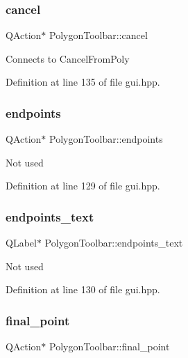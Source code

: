 \subsubsection{\texorpdfstring{cancel}{cancel}}
{\footnotesize\ttfamily Q\+Action$\ast$ Polygon\+Toolbar\+::cancel}

Connects to Cancel\+From\+Poly 

Definition at line 135 of file gui.\+hpp.

\mbox{\label{structPolygonToolbar_a78a569efc30754e02b7d8f5d74ede0ec}} 
\subsubsection{\texorpdfstring{endpoints}{endpoints}}
{\footnotesize\ttfamily Q\+Action$\ast$ Polygon\+Toolbar\+::endpoints}

Not used 

Definition at line 129 of file gui.\+hpp.

\mbox{\label{structPolygonToolbar_a4ab3ad9905d894a2f166a4e1cbfb9e3a}} 
\subsubsection{\texorpdfstring{endpoints\+\_\+text}{endpoints\_text}}
{\footnotesize\ttfamily Q\+Label$\ast$ Polygon\+Toolbar\+::endpoints\+\_\+text}

Not used 

Definition at line 130 of file gui.\+hpp.

\mbox{\label{structPolygonToolbar_a25d471a6081bfa4107d5f1cd9a61d243}} 
\subsubsection{\texorpdfstring{final\+\_\+point}{final\_point}}
{\footnotesize\ttfamily Q\+Action$\ast$ Polygon\+Toolbar\+::final\+\_\+point}


